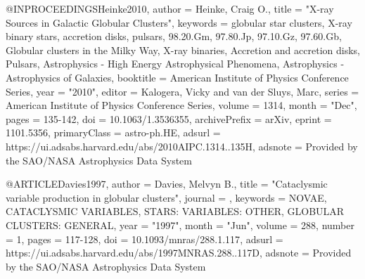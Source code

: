 \documentclass[twocolumn,tighten]{aastex63}
\begin{document}
@INPROCEEDINGS{Heinke2010,
       author = {{Heinke}, Craig O.},
        title = "{X-ray Sources in Galactic Globular Clusters}",
     keywords = {globular star clusters, X-ray binary stars, accretion disks, pulsars, 98.20.Gm, 97.80.Jp, 97.10.Gz, 97.60.Gb, Globular clusters in the Milky Way, X-ray binaries, Accretion and accretion disks, Pulsars, Astrophysics - High Energy Astrophysical Phenomena, Astrophysics - Astrophysics of Galaxies},
    booktitle = {American Institute of Physics Conference Series},
         year = "2010",
       editor = {{Kalogera}, Vicky and {van der Sluys}, Marc},
       series = {American Institute of Physics Conference Series},
       volume = {1314},
        month = "Dec",
        pages = {135-142},
          doi = {10.1063/1.3536355},
archivePrefix = {arXiv},
       eprint = {1101.5356},
 primaryClass = {astro-ph.HE},
       adsurl = {https://ui.adsabs.harvard.edu/abs/2010AIPC.1314..135H},
      adsnote = {Provided by the SAO/NASA Astrophysics Data System}
}

@ARTICLE{Davies1997,
       author = {{Davies}, Melvyn B.},
        title = "{Cataclysmic variable production in globular clusters}",
      journal = {\mnras},
     keywords = {NOVAE, CATACLYSMIC VARIABLES, STARS: VARIABLES: OTHER, GLOBULAR CLUSTERS: GENERAL},
         year = "1997",
        month = "Jun",
       volume = {288},
       number = {1},
        pages = {117-128},
          doi = {10.1093/mnras/288.1.117},
       adsurl = {https://ui.adsabs.harvard.edu/abs/1997MNRAS.288..117D},
      adsnote = {Provided by the SAO/NASA Astrophysics Data System}
}
\end{document}
